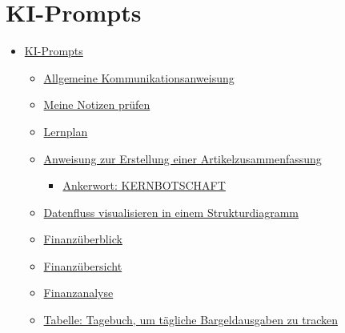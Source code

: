 \documentclass{vorlage-design-main}
\title{}
\author{Jan Unger}
\date{\today}
\begin{document}
\maketitle

\begin{abstract}



\end{abstract}

\section{KI-Prompts}\label{ki-prompts}

\begin{itemize}

\item
  \hyperref[ki-prompts]{KI-Prompts}

  \begin{itemize}
  
  \item
    \hyperref[allgemeine-kommunikationsanweisung]{Allgemeine
    Kommunikationsanweisung}
  \item
    \hyperref[meine-notizen-pruxfcfen]{Meine Notizen prüfen}
  \item
    \hyperref[lernplan]{Lernplan}
  \item
    \hyperref[anweisung-zur-erstellung-einer-artikelzusammenfassung]{Anweisung
    zur Erstellung einer Artikelzusammenfassung}

    \begin{itemize}
    
    \item
      \hyperref[ankerwort-kernbotschaft]{Ankerwort: KERNBOTSCHAFT}
    \end{itemize}
  \item
    \hyperref[datenfluss-visualisieren-in-einem-strukturdiagramm]{Datenfluss
    visualisieren in einem Strukturdiagramm}
  \item
    \hyperref[finanzuxfcberblick]{Finanzüberblick}
  \item
    \hyperref[finanzuxfcbersicht]{Finanzübersicht}
  \item
    \hyperref[finanzanalyse]{Finanzanalyse}
  \item
    \hyperref[tabelle-tagebuch-um-tuxe4gliche-bargeldausgaben-zu-tracken]{Tabelle:
    Tagebuch, um tägliche Bargeldausgaben zu tracken}
  \end{itemize}
\end{itemize}
\end{document}
